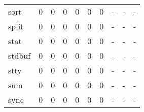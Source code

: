 \begin{longtable}{lp{2.0cm}p{2.0cm}p{2.0cm}p{2.0cm}p{2.0cm}p{2.0cm}p{2.0cm}p{2.0cm}p{2.0cm}}
sort      &                      0 &                                             0 &                                            0 &                                           0 &                                            0 &                                          0 &                                    - &                                      - &                                    - \\
split     &                      0 &                                             0 &                                            0 &                                           0 &                                            0 &                                          0 &                                    - &                                      - &                                    - \\
stat      &                      0 &                                             0 &                                            0 &                                           0 &                                            0 &                                          0 &                                    - &                                      - &                                    - \\
stdbuf    &                      0 &                                             0 &                                            0 &                                           0 &                                            0 &                                          0 &                                    - &                                      - &                                    - \\
stty      &                      0 &                                             0 &                                            0 &                                           0 &                                            0 &                                          0 &                                    - &                                      - &                                    - \\
sum       &                      0 &                                             0 &                                            0 &                                           0 &                                            0 &                                          0 &                                    - &                                      - &                                    - \\
sync      &                      0 &                                             0 &                                            0 &                                           0 &                                            0 &                                          0 &                                    - &                                      - &                                    - \\

\end{longtable}
